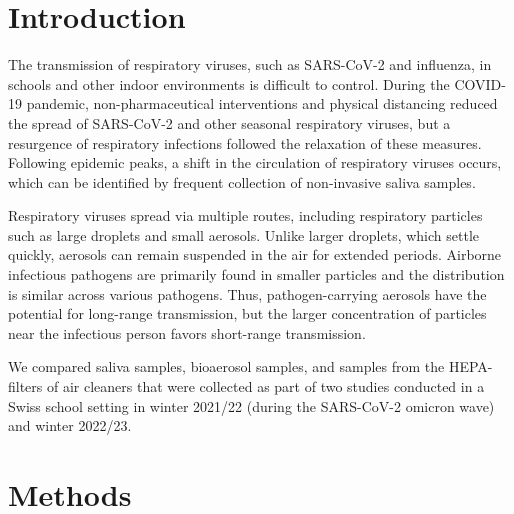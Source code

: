 \documentclass[fleqn,11pt]{wlscirep}
\begin{document}
\thispagestyle{empty}
\sloppy
\raggedbottom

\newpage

\setcounter{page}{1}

\section*{Introduction}

The transmission of respiratory viruses, such as SARS-CoV-2 and influenza, in schools and other indoor environments is difficult to control\cite{Leung2020NatMed}. During the COVID-19 pandemic, non-pharmaceutical interventions and physical distancing reduced the spread of SARS-CoV-2 and other seasonal respiratory viruses, but a resurgence of respiratory infections followed the relaxation of these measures\cite{Poole2020LancetRespMed,Sauteur2022EuroSurv,Kandeel2023BMC}. Following epidemic peaks, a shift in the circulation of respiratory viruses occurs\cite{Pierangeli2012CMI}, which can be identified by frequent collection of non-invasive saliva samples\cite{Pasomsub2021CMI}. 

Respiratory viruses spread via multiple routes, including respiratory particles such as large droplets and small aerosols. Unlike larger droplets, which settle quickly, aerosols can remain suspended in the air for extended periods\cite{Wang2021}. Airborne infectious pathogens are primarily found in smaller particles and the distribution is similar across various pathogens\cite{Fennelly2020}. Thus, pathogen-carrying aerosols have the potential for long-range transmission, but the larger concentration of particles near the infectious person favors short-range transmission\cite{Wang2020}. 


We compared saliva samples, bioaerosol samples, and samples from the HEPA-filters of air cleaners that were collected as part of two studies conducted in a Swiss school setting in winter 2021/22 (during the SARS-CoV-2 omicron wave)\cite{Banholzer2023PLoSMed} and winter 2022/23\cite{Banholzer2023medRxiv}. 


\section*{Methods}
\end{document}
